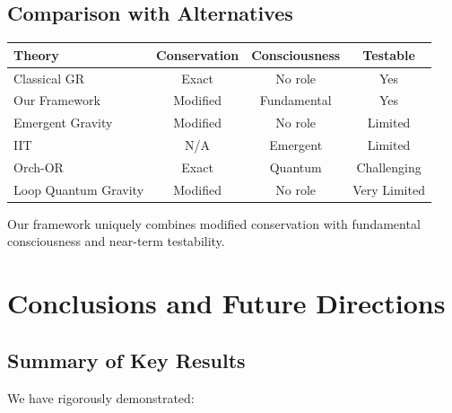 \documentclass[11pt]{article}
\theoremstyle{definition}
\begin{document}
\subsection{Comparison with Alternatives}

\begin{center}
\begin{tabular}{|l|c|c|c|}
\hline
\textbf{Theory} & \textbf{Conservation} & \textbf{Consciousness} & \textbf{Testable} \\
\hline
Classical GR & Exact & No role & Yes \\
Our Framework & Modified & Fundamental & Yes \\
Emergent Gravity & Modified & No role & Limited \\
IIT & N/A & Emergent & Limited \\
Orch-OR & Exact & Quantum & Challenging \\
Loop Quantum Gravity & Modified & No role & Very Limited \\
\hline
\end{tabular}
\end{center}

Our framework uniquely combines modified conservation with fundamental consciousness and near-term testability.

\section{Conclusions and Future Directions}

\subsection{Summary of Key Results}

We have rigorously demonstrated:
\end{document}
